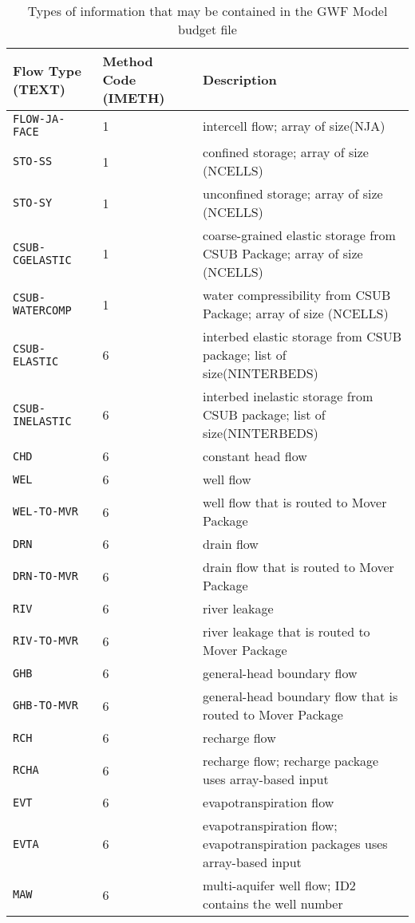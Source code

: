 \begin{longtable}{p{3.5cm} p{2cm} p{9cm}}
\caption{Types of information that may be contained in the GWF Model budget file} 
\tabularnewline
\hline
\textbf{Flow Type (TEXT)} & \textbf{Method Code (IMETH)} & \textbf{Description} \\
\hline
\endhead
\hline
\endfoot
\texttt{FLOW-JA-FACE} & 1 & intercell flow; array of size(NJA) \\
\texttt{STO-SS} & 1 & confined storage; array of size (NCELLS) \\
\texttt{STO-SY} & 1 & unconfined storage; array of size (NCELLS) \\
\texttt{CSUB-CGELASTIC} & 1 & coarse-grained elastic storage from CSUB Package; array of size (NCELLS) \\
\texttt{CSUB-WATERCOMP} & 1 & water compressibility from CSUB Package; array of size (NCELLS) \\
\texttt{CSUB-ELASTIC} & 6 & interbed elastic storage from CSUB package; list of size(NINTERBEDS) \\
\texttt{CSUB-INELASTIC} & 6 & interbed inelastic storage from CSUB package; list of size(NINTERBEDS) \\
\texttt{CHD} & 6 & constant head flow\\
\texttt{WEL} & 6 & well flow \\
\texttt{WEL-TO-MVR} & 6 & well flow that is routed to Mover Package \\
\texttt{DRN} & 6 & drain flow \\
\texttt{DRN-TO-MVR} & 6 & drain flow that is routed to Mover Package\\
\texttt{RIV} & 6 & river leakage \\
\texttt{RIV-TO-MVR} & 6 & river leakage that is routed to Mover Package\\
\texttt{GHB} & 6 & general-head boundary flow \\
\texttt{GHB-TO-MVR} & 6 & general-head boundary flow that is routed to Mover Package\\
\texttt{RCH} & 6 & recharge flow \\
\texttt{RCHA} & 6 & recharge flow; recharge package uses array-based input \\
\texttt{EVT} & 6 & evapotranspiration flow \\
\texttt{EVTA} & 6 & evapotranspiration flow; evapotranspiration packages uses array-based input \\
\texttt{MAW} & 6 & multi-aquifer well flow; ID2 contains the well number \\

\end{longtable}
